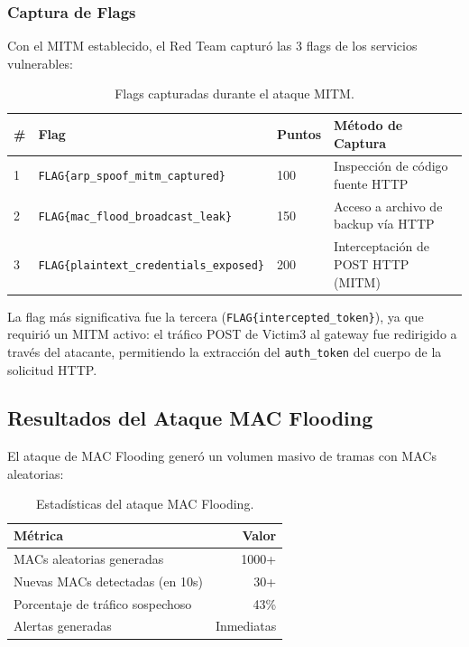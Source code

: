 \documentclass[12pt, a4paper]{article}
\begin{document}
\subsubsection{Captura de Flags}

Con el MITM establecido, el Red Team captur\'o las 3 flags de los servicios vulnerables:

\begin{table}[H]
    \centering
    \caption{Flags capturadas durante el ataque MITM.}
    \label{tab:captured-flags}
    \begin{tabularx}{\textwidth}{|l|l|l|X|}
        \hline
        \textbf{\#} & \textbf{Flag} & \textbf{Puntos} & \textbf{M\'etodo de Captura} \\
        \hline\hline
        1 & \texttt{FLAG\{arp\_spoof\_mitm\_captured\}} & 100 & Inspecci\'on de c\'odigo fuente HTTP \\
        \hline
        2 & \texttt{FLAG\{mac\_flood\_broadcast\_leak\}} & 150 & Acceso a archivo de backup v\'ia HTTP \\
        \hline
        3 & \texttt{FLAG\{plaintext\_credentials\_exposed\}} & 200 & Interceptaci\'on de POST HTTP (MITM) \\
        \hline
    \end{tabularx}
\end{table}

La flag m\'as significativa fue la tercera (\texttt{FLAG\{intercepted\_token\}}), ya que requiri\'o un MITM activo: el tr\'afico POST de Victim3 al gateway fue redirigido a trav\'es del atacante, permitiendo la extracci\'on del \texttt{auth\_token} del cuerpo de la solicitud HTTP.

\subsection{Resultados del Ataque MAC Flooding}

El ataque de MAC Flooding gener\'o un volumen masivo de tramas con MACs aleatorias:

\begin{table}[H]
    \centering
    \caption{Estad\'isticas del ataque MAC Flooding.}
    \label{tab:mac-flood-stats}
    \begin{tabular}{|l|r|}
        \hline
        \textbf{M\'etrica} & \textbf{Valor} \\
        \hline\hline
        MACs aleatorias generadas & 1000+ \\
        \hline
        Nuevas MACs detectadas (en 10s) & 30+ \\
        \hline
        Porcentaje de tr\'afico sospechoso & 43\% \\
        \hline
        Alertas generadas & Inmediatas \\
        \hline
    \end{tabular}
\end{table}
\end{document}

